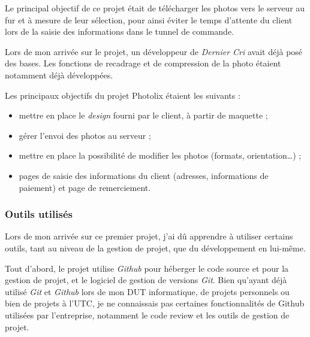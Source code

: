 \documentclass[12pt,a4paper]{article}
\providecommand{\tightlist}{%
  \setlength{\itemsep}{0pt}\setlength{\parskip}{0pt}}
\begin{document}
  \bigskip

  Le principal objectif de ce projet était de télécharger les photos vers
  le serveur au fur et à mesure de leur sélection, pour ainsi éviter le
  temps d'attente du client lors de la saisie des informations dans le
  tunnel de commande.

  \bigskip

  Lors de mon arrivée sur le projet, un développeur de \emph{Dernier Cri}
  avait déjà posé des bases. Les fonctions de recadrage et de compression
  de la photo étaient notamment déjà développées.

  \bigskip

  Les principaux objectifs du projet Photolix étaient les suivants :

  \begin{itemize}
  \tightlist
  \item
    mettre en place le \emph{design} fourni par le client, à partir de
    maquette ;
  \item
    gérer l'envoi des photos au serveur ;
  \item
    mettre en place la possibilité de modifier les photos (formats,
    orientation\ldots{}) ;
  \item
    pages de saisie des informations du client (adresses, informations de
    paiement) et page de remerciement.
  \end{itemize}

  \bigskip

  \subsubsection{Outils utilisés}\label{outils-utilisuxe9s}

  \bigskip

  Lors de mon arrivée sur ce premier projet, j'ai dû apprendre à utiliser
  certains outils, tant au niveau de la gestion de projet, que du
  développement en lui-même.

  \bigskip

  Tout d'abord, le projet utilise \emph{Github} pour héberger le code
  source et pour la gestion de projet, et le logiciel de gestion de
  versions \emph{Git}. Bien qu'ayant déjà utilisé \emph{Git} et
  \emph{Github} lors de mon DUT informatique, de projets personnels ou
  bien de projets à l'UTC, je ne connaissais pas certaines fonctionnalités
  de Github utilisées par l'entreprise, notamment le code review et les
  outils de gestion de projet.
\end{document}
